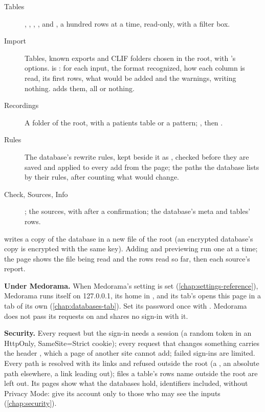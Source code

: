 \begin{description}
\item[Tables] , , , ,  and
  , a hundred rows at a time, read-only, with a filter box.
\item[Import] Tables, known exports and CLIF folders chosen in the root, with 's options.
   is : for each input, the format recognized, how each column is
  read, its first rows, what would be added and the warnings, writing nothing.  adds them,
  all or nothing.
\item[Recordings] A folder of the root, with a patients table or a pattern; , then
  .
\item[Rules] The database's rewrite rules, kept beside it as , checked
  before they are saved and applied to every add from the page;  the paths the
  database lists by their \code{[[path]]} rules, after counting what would change.
\item[Check, Sources, Info] ; the sources, with  after a confirmation;
  the database's meta and tables' rows.
\end{description}
 writes a copy of the database in a new file of the root (an encrypted
database's copy is encrypted with the same key). Adding and previewing run one at a time; the page
shows the file being read and the rows read so far, then each source's report.

\textbf{Under Medorama.} When Medorama's setting  is set
(\cref{chap:settings-reference}), Medorama runs  itself on 127.0.0.1, its
home in , and its  tab's 
opens this page in a tab of its own (\cref{chap:databases-tab}). Set its password once with
. Medorama does not
pass its requests on and shares no sign-in with it.

\textbf{Security.} Every request but the sign-in needs a session (a random token in an HttpOnly,
SameSite=Strict cookie); every request that changes something carries the header
, which a page of another site cannot add; failed sign-ins are limited.
Every path is resolved with its links and refused outside the root (a , an absolute
path elsewhere, a link leading out); files a table's rows name outside the root are left out. Its
pages show what the databases hold, identifiers included, without Privacy Mode: give its account
only to those who may see the inputs (\cref{chap:security}).

